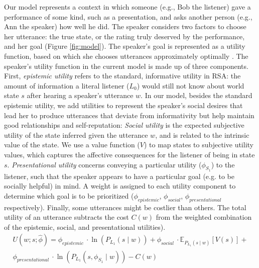 \documentclass[12pt]{article}
\newcommand{\ejy}[1]{\textcolor{Red}{[ejy: #1]}}
\begin{document}
Our model represents a context in which someone (e.g., Bob the listener) gave a performance of some kind, 
such as a presentation, and asks another person (e.g., Ann the speaker) how well he did. 
The speaker considers two factors to choose her utterance: 
the true state, or the rating truly deserved by the performance, 
and her goal (Figure \ref{fig:model}). 
The speaker's goal is represented as a utility function, 
based on which she chooses utterances approximately optimally \cite{goodman2013}. 
The speaker's utility function in the current model is made up of three components.
First, \emph{epistemic utility} refers to the standard, informative utility in RSA: 
the amount of information a literal listener (\(L_0\)) would still not know about world state \(s\) after hearing a speaker's utterance \(w\).
In our model, besides the standard epistemic utility, 
we add utilities to represent the speaker's social desires that lead her to produce utterances that deviate from informativity 
but help maintain good relationships and self-reputation:
\emph{Social utility} is the expected subjective utility of the state inferred given the utterance \(w\), 
and is related to the intrinsic value of the state.
We use a value function (\(V\)) to map states to subjective utility values,
which captures the affective consequences for the listener of being in state \(s\). 
\emph{Presentational utility} concerns conveying a particular utility (\(\phi_{S_1}\)) to the listener, 
such that the speaker appears to have a particular goal (e.g. to be socially helpful) in mind.
A weight is assigned to each utility component to determine which goal is to be prioritized (\(\phi_{epistemic}\), \(\phi_{social}\), \(\phi_{presentational}\) respectively). 
Finally, some utterances might be costlier than others. 
The total utility of an utterance subtracts the cost $C(w)$ from the weighted combination of the epistemic, social, and presentational utilities). 
\begin{multline}
U(w;s; \hat{\phi}) =  \phi_{epistemic}\ \cdot \ln(P_{L_1}(s \mid w))  +
\phi_{social}\ \cdot \mathbb{E}_{P_{L_1}(s \mid w)}[V(s)] + \\
\phi_{presentational}\ \cdot \ln(P_{L_1}(s,  \phi_{S_1} \mid w)) -
C(w)
\end{multline}
\end{document}
